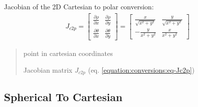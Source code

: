 \documentclass[letterpaper,10pt,english]{sphinxmanual}
\begin{document}
\begin{fulllineitems}
\label{\detokenize{conversions:conversions.J_c2p}}
\pysigstartsignatures
{}
\pysigstopsignatures
\sphinxAtStartPar
Jacobian of the 2D Cartesian to polar conversion:
\begin{equation}\label{equation:conversions:eq-Jc2p}
\begin{split}J_{c2p} = \begin{bmatrix} \frac{\partial \rho}{\partial x} & \frac{\partial \rho}{\partial y} \\ \frac{\partial \theta}{\partial x} & \frac{\partial \theta}{\partial y} \end{bmatrix} = \begin{bmatrix} \frac{x}{\sqrt{x^2+y^2}} & \frac{y}{\sqrt{x^2+y^2}} \\ -\frac{y}{x^2+y^2} & \frac{x}{x^2+y^2} \end{bmatrix}\end{split}
\end{equation}\begin{quote}\begin{description}
\sphinxAtStartPar
{} \textendash{} point in cartesian coordinates

\sphinxAtStartPar
Jacobian matrix \(J_{c2p}\) (eq. \eqref{equation:conversions:eq-Jc2p})

\end{description}\end{quote}

\end{fulllineitems}



\subsection{Spherical To Cartesian}
\label{\detokenize{conversions:spherical-to-cartesian}}
\end{document}
